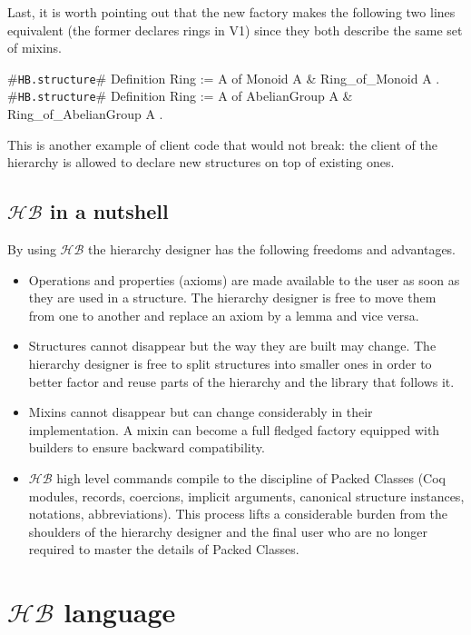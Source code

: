 \documentclass[a4paper,UKenglish,cleveref, autoref]{lipics-v2019}
\newcommand{\HB}{\ensuremath{\mathcal{HB}}}
\newcommand{\mixin}{mixin}
\newcommand{\mixins}{mixins}
\newcommand{\Mixins}{Mixins}
\newcommand{\factory}{factory}
\newcommand{\phantterms}{abbreviations}
\newcommand{\builder}{builder}
\newcommand{\hbstructure}{{\tt\color{dkgreen}HB.structure}}
\theoremstyle{implem}
\theoremstyle{implem}
\theoremstyle{command}
\theoremstyle{commands}
\begin{document}
Last, it is worth pointing out that the new \factory{} makes the following
two lines equivalent (the former declares
rings in V1) since they both describe the same set of \mixins{}.

\begin{coqcode}
#\hbstructure{}# Definition Ring := { A of Monoid A & Ring_of_Monoid A }.
#\hbstructure{}# Definition Ring := { A of AbelianGroup A & Ring_of_AbelianGroup A }.
\end{coqcode}

This is another example of client code that would not break: the client of the hierarchy is allowed to declare new
structures on top of existing ones.

\subsection{\HB{} in a nutshell}

By using \HB{} the hierarchy designer has the following freedoms and advantages.

\begin{itemize}
\item Operations and properties (axioms) are made available to the user
      as soon as they are used in a structure. The hierarchy designer
      is free to move them from one to another and replace an axiom
      by a lemma and vice versa.
\item Structures cannot disappear but the way they are built may change.
      The hierarchy designer is free to split structures into smaller
      ones in order to better factor and reuse parts of the hierarchy
      and the library that follows it.
\item \Mixins{} cannot disappear but can change considerably
      in their implementation. A \mixin{} can become a full fledged
      \factory{} equipped with \builder{}s to ensure backward compatibility.
\item \HB{} high level commands compile to
      the discipline of Packed Classes (Coq modules, records, coercions,
      implicit arguments, canonical structure instances, notations,
      \phantterms{}).
      This process lifts a considerable
      burden from the shoulders of the hierarchy designer and the final user
      who are no longer required to master the details of Packed Classes.
\end{itemize}

\section{\HB{} language}\label{sec:language}
\end{document}
